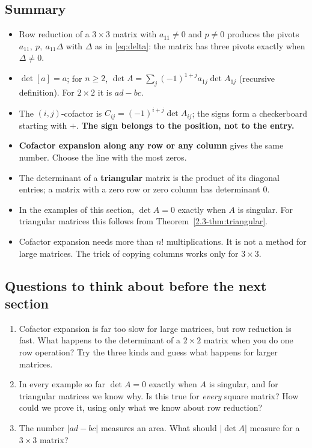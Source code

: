 \documentclass[11pt]{article}
\begin{document}
\subsection*{Summary}
\begin{itemize}
  \item Row reduction of a $3\times3$ matrix with $a_{11}\neq0$ and $p\neq0$ produces the pivots $a_{11},\ p,\ a_{11}\Delta$ with $\Delta$ as in \eqref{eq:delta}: the matrix has three pivots exactly when $\Delta\neq0$.
  \item $\det[a]=a$; for $n\geq2$, $\det A=\sum_j(-1)^{1+j}a_{1j}\det A_{1j}$ (recursive definition). For $2\times2$ it is $ad-bc$.
  \item The $(i,j)$-cofactor is $C_{ij}=(-1)^{i+j}\det A_{ij}$; the signs form a checkerboard starting with $+$. \textbf{The sign belongs to the position, not to the entry.}
  \item \textbf{Cofactor expansion along any row or any column} gives the same number. Choose the line with the most zeros.
  \item The determinant of a \textbf{triangular} matrix is the product of its diagonal entries; a matrix with a zero row or zero column has determinant $0$.
  \item In the examples of this section, $\det A=0$ exactly when $A$ is singular. For triangular matrices this follows from Theorem~\ref{2.3-thm:triangular}.
  \item Cofactor expansion needs more than $n!$ multiplications. It is not a method for large matrices. The trick of copying columns works only for $3\times3$.
\end{itemize}

\subsection*{Questions to think about before the next section}
\begin{enumerate}
  \item Cofactor expansion is far too slow for large matrices, but row reduction is fast. What happens to the determinant of a $2\times2$ matrix when you do one row operation? Try the three kinds and guess what happens for larger matrices.
  \item In every example so far $\det A=0$ exactly when $A$ is singular, and for triangular matrices we know why. Is this true for \emph{every} square matrix? How could we prove it, using only what we know about row reduction?
  \item The number $|ad-bc|$ measures an area. What should $|\det A|$ measure for a $3\times3$ matrix?
\end{enumerate}
\end{document}
